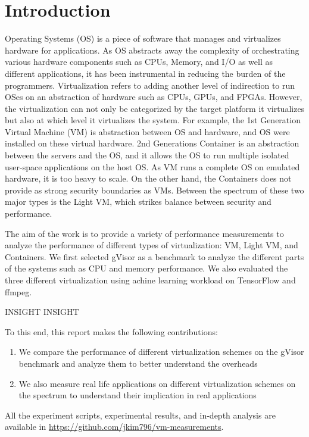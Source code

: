 \section{Introduction}
\label{sec:intro}
%
Operating Systems (OS) is a piece of software that manages and virtualizes hardware for applications.
%
As OS abstracts away the complexity of orchestrating various hardware components such as CPUs, Memory, and I/O as well as different applications, it has been instrumental in reducing the burden of the programmers.
%
Virtualization refers to adding another level of indirection to run OSes on an abstraction of hardware such as CPUs, GPUs, and FPGAs.
%
However, the virtualization can not only be categorized by the target platform it virtualizes but also at which level it virtualizes the system.
%
For example, the 1st Generation Virtual Machine (VM) is abstraction between OS and hardware, and OS were installed on these virtual hardware.
%
2nd Generations Container is an abstraction between the servers and the OS, and it allows the OS to run multiple isolated user-space applications on the host OS.
%
As VM runs a complete OS on emulated hardware, it is too heavy to scale.
%
On the other hand, the Containers does not provide as strong security boundaries as VMs.
%
Between the spectrum of these two major types is the Light VM, which strikes balance between security and performance.
%

The aim of the work is to provide a variety of performance measurements to analyze the performance of different types of virtualization: VM, Light VM, and Containers.
%
We first selected gVisor as a benchmark to analyze the different parts of the systems such as CPU and memory performance.
%
We also evaluated the three different virtualization using achine learning workload on TensorFlow and ffmpeg.
%

INSIGHT INSIGHT

%
To this end, this report makes the following contributions:

\begin{enumerate}

\item We compare the performance of different virtualization schemes on the gVisor benchmark and analyze them to better understand the overheads
\item We also measure real life applications on different virtualization schemes on the spectrum to understand their implication in real applications

\end{enumerate}

All the experiment scripts, experimental results, and in-depth analysis are available in \url{https://github.com/jkim796/vm-measurements}.
